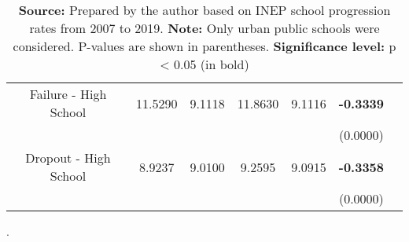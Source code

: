 \begin{table}[htbp]
\begin{tabular}{ccccccc}
        Failure - High School  & 11.5290 & 9.1118 & 11.8630 & 9.1116 & \textbf{-0.3339} \\ 
                     &          &         &          &         & (0.0000) \\
    
        Dropout - High School    & 8.9237 & 9.0100 & 9.2595 & 9.0915 & \textbf{-0.3358} \\ 
                     &          &         &          &         & (0.0000) \\
        \bottomrule
        \end{tabular}%
    \label{tab:testet}%
\caption*{\footnotesize\textbf{Source:} Prepared by the author based on INEP school progression rates from 2007 to 2019. \textbf{Note:} Only urban public schools were considered. P-values are shown in parentheses. \textbf{Significance level:} p < 0.05 (in bold)}.
\end{table}

